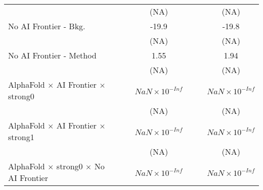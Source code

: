 \begin{tabular}{lcccccc}
                                                                              &                        &                        & (NA)                   &                        &                        & (NA)\\   
   No AI Frontier - Bkg.                                                      &                        &                        & -19.9                  &                        &                        & -19.8\\   
                                                                              &                        &                        & (NA)                   &                        &                        & (NA)\\   
   No AI Frontier - Method                                                    &                        &                        & 1.55                   &                        &                        & 1.94\\   
                                                                              &                        &                        & (NA)                   &                        &                        & (NA)\\   
   AlphaFold $\times$ AI Frontier $\times$ strong0                            &                        &                        & $NaN\times 10^{-Inf}$  &                        &                        & $NaN\times 10^{-Inf}$\\    
                                                                              &                        &                        & (NA)                   &                        &                        & (NA)\\   
   AlphaFold $\times$ AI Frontier $\times$ strong1                            &                        &                        & $NaN\times 10^{-Inf}$  &                        &                        & $NaN\times 10^{-Inf}$\\    
                                                                              &                        &                        & (NA)                   &                        &                        & (NA)\\   
   AlphaFold $\times$ strong0 $\times$ No AI Frontier                         &                        &                        & $NaN\times 10^{-Inf}$  &                        &                        & $NaN\times 10^{-Inf}$\\    

\end{tabular}
